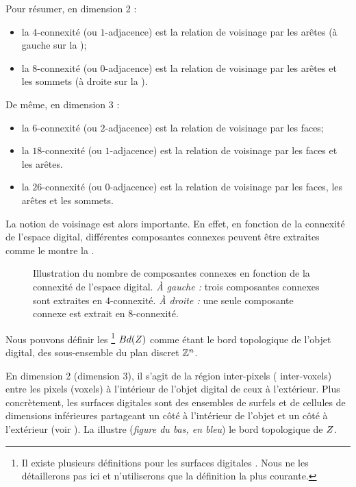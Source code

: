 Pour résumer, en dimension 2 :
%
\begin{itemize}
  \item la $4$-connexité (ou $1$-adjacence) est la relation de voisinage par les
  arêtes (à gauche sur la );
  \item la $8$-connexité (ou $0$-adjacence) est la relation de voisinage par les
  arêtes et les sommets (à droite sur la ).
\end{itemize}
%
De même, en dimension 3 :
%
\begin{itemize}
  \item la $6$-connexité (ou $2$-adjacence) est la relation de voisinage par les
  faces;
  \item la $18$-connexité (ou $1$-adjacence) est la relation de voisinage par
  les faces et les arêtes.
  \item la $26$-connexité (ou $0$-adjacence) est la relation de voisinage par
  les faces, les arêtes et les sommets.
\end{itemize}


La notion de voisinage est alors importante. En effet, en fonction de la
connexité de l'espace digital, différentes composantes connexes peuvent être
extraites comme le montre la .

\begin{figure}[ht]
  \begin{center}
    
  \end{center}
  \caption[Illustration du nombre de composantes connexes en fonction de la connexité de l'espace digital.]
  {Illustration du nombre de composantes connexes en fonction de la connexité de
  l'espace digital. \emph{À gauche :} trois composantes connexes sont extraites
  en $4$-connexité. \emph{À droite :} une seule composante connexe est extrait
  en $8$-connexité.\label{fig:connexite}}
\end{figure}


Nous pouvons définir les \footnote{Il existe
plusieurs définitions pour les surfaces digitales \cite{Rosenfeld1979,
Latecki1995}. Nous ne les détaillerons pas ici et n'utiliserons que la
définition la plus courante.} $Bd(Z)$ comme étant le bord
topologique de l'objet digital, \cad des sous-ensemble du plan discret $\mathbb{Z}^n$.



En dimension 2 (\respp dimension 3), il s'agit de la région inter-pixels (\resp
inter-voxels) entre les pixels (\resp voxels) à l'intérieur de l'objet digital de
ceux à l'extérieur. Plus concrètement, les surfaces digitales sont des ensembles
de surfels et de cellules de dimensions inférieures partageant un côté à
l'intérieur de l'objet et un côté à l'extérieur (voir \cite{Herman1998,
Udupa1994, Kong1992}). La  illustre (\emph{figure du
bas, en bleu}) le bord topologique de $Z$.


